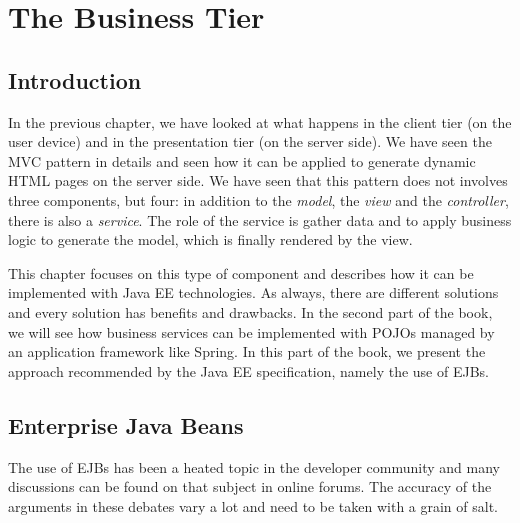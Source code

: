 \chapter{The Business Tier}
\label{ch:business-tier}

\section{Introduction}

In the previous chapter, we have looked at what happens in the client tier (on the user device) and in the presentation tier (on the server side). We have seen the \ac{MVC} pattern in details and seen how it can be applied to generate dynamic HTML pages on the server side. We have seen that this pattern does not involves three components, but four: in addition to the \emph{model}, the \emph{view} and the \emph{controller}, there is also a \emph{service}. The role of the service is gather data and to apply business logic to generate the model, which is finally rendered by the view.


This chapter focuses on this type of component and describes how it can be implemented with \ac{Java EE} technologies. As always, there are different solutions and every solution has benefits and drawbacks. In the second part of the book, we will see how business services can be implemented with \ac{POJO}s managed by an application framework like Spring. In this part of the book, we present the approach recommended by the \ac{Java EE} specification, namely the use of \ac{EJB}s.

\section{Enterprise Java Beans}

The use of \ac{EJB}s has been a heated topic in the developer community and many discussions can be found on that subject in online forums. The accuracy of the arguments in these debates vary a lot and need to be taken with a grain of salt. 


